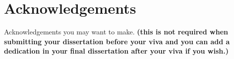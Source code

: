 \section*{\centering Acknowledgements} \vspace{12pt}

Acknowledgements you may want to make. \textbf{(this is not required when submitting your dissertation before your viva and you can add a dedication in your final dissertation after your viva if you wish.)}